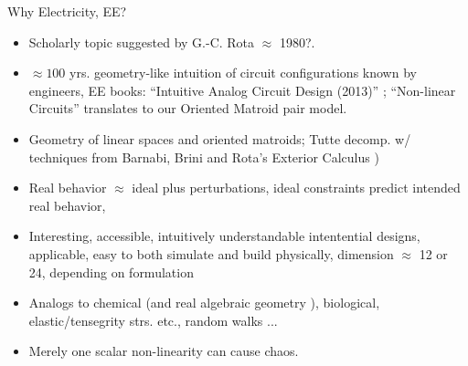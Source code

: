 \documentclass{beamer}
\newcommand{\Remph}[1]{{\color{red}#1}}
\begin{document}
\begin{frame}{Why Electricity, EE?}
\begin{itemize}
\item Scholarly topic suggested by G.-C. Rota $\approx$ 1980?.
\item $\approx 100$ yrs. geometry-like intuition of
circuit configurations known by engineers, EE books:
\Remph{``Intuitive Analog Circuit Design (2013)''
\cite{intuitAna}}; ``Non-linear Circuits'' \cite{HaslerNeirynck}
translates to our Oriented Matroid pair model.

\item Geometry of linear spaces and oriented matroids;
Tutte decomp. w/
techniques from Barnabi, Brini and Rota's Exterior Calculus 
\cite{exteriorCalc})

\item
Real behavior $\approx$ ideal plus perturbations,
ideal constraints predict intended real behavior,

\item 
Interesting, accessible, intuitively understandable
intentential designs, applicable,
easy to both simulate and build physically, dimension
$\approx$
12 or 24, depending on formulation
\item
Analogs to chemical (and real algebraic geometry 
\cite{signsInChemRAG}), biological, \Remph{elastic/tensegrity strs.} etc., 
random walks ...
\item
Merely one scalar non-linearity can cause chaos.
\end{itemize}
\end{frame}

\end{document}
